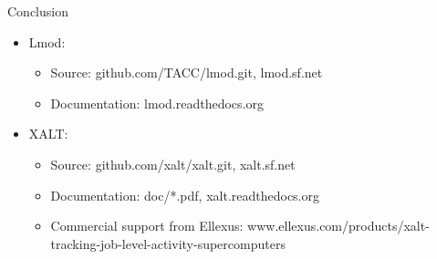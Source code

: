 \documentclass{beamer}
\begin{document}
\begin{frame}{Conclusion}
  \begin{itemize}
    \item Lmod:
      \begin{itemize}
        \item Source: github.com/TACC/lmod.git, lmod.sf.net
        \item Documentation: lmod.readthedocs.org
      \end{itemize}
    \item XALT:
      \begin{itemize}
        \item Source: github.com/xalt/xalt.git, xalt.sf.net
        \item Documentation: doc/*.pdf, xalt.readthedocs.org
        \item Commercial support from Ellexus: www.ellexus.com/products/xalt-tracking-job-level-activity-supercomputers
      \end{itemize}
  \end{itemize}
\end{frame}
\end{document}
